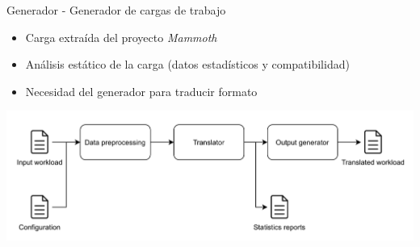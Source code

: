 \documentclass[12pt, spanish]{beamer}
\begin{document}
\begin{frame}{Generador - Generador de cargas de trabajo} %

    \begin{center}
        \begin{itemize}
            \item Carga extraída del proyecto \textit{Mammoth}
            \item Análisis estático de la carga (datos estadísticos y compatibilidad)
            \item Necesidad del generador para traducir formato
        \end{itemize}
        
        \includegraphics[width=\textwidth]{images/Parser-arq.png}
    \end{center}

\end{frame}
\end{document}
